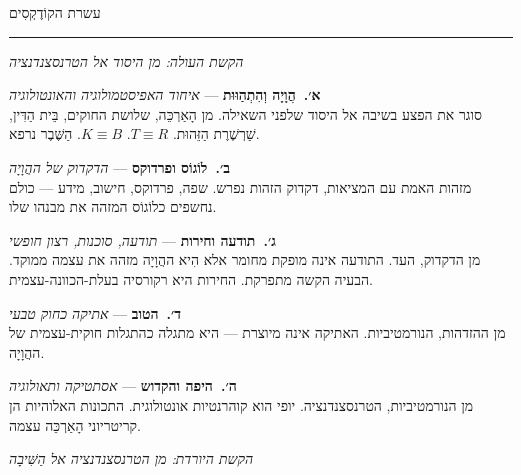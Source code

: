 \documentclass[10pt, openany, oneside]{book}
\renewcommand{\large}{\fontsize{11.5}{14}\selectfont}
\newcommand{\separator}{%
    \begin{center}
        \vspace{0.3em}
        \rule{0.3\textwidth}{0.4pt}
        \vspace{0.3em}
    \end{center}
}
\begin{document}
\begin{center}
    {\large\textsc{עשרת הקוֹדֶקְסִים}}
\end{center}
\separator

\vspace{0.3em}

\begin{center}
    \textit{הקשת העולה: מן היסוד אל הטרנסצנדנציה}
\end{center}

\vspace{0.5em}

\noindent \textbf{א׳.\ הֲוָיָה וְהִתְהַוּוּת} --- \textit{איחוד האפיסטמולוגיה והאונטולוגיה}\\
סוגר את הפצע בשיבה אל היסוד שלפני השאילה. מן הָאַרְכֵּה, שלושת החוקים, בֵּית הַדִּין, שַׁרְשֶׁרֶת הַזֵּהוּת. $T \equiv R$. $K \equiv B$. הַשֶּׁבֶר נרפא.

\vspace{0.5em}

\noindent \textbf{ב׳.\ לוֹגוֹס ופרדוקס} --- \textit{הדקדוק של ההֲוָיָה}\\
מזהות האמת עם המציאות, דקדוק הזהות נפרש. שפה, פרדוקס, חישוב, מידע — כולם נחשפים כלוֹגוֹס המזהה את מבנהו שלו.

\vspace{0.5em}

\noindent \textbf{ג׳.\ תודעה וחירות} --- \textit{תודעה, סוכנות, רצון חופשי}\\
מן הדקדוק, העד. התודעה אינה מופקת מחומר אלא הִיא ההֲוָיָה מזהה את עצמה ממוקד. הבעיה הקשה מתפרקת. החירות היא רקורסיה בעלת-הכוונה-עצמית.

\vspace{0.5em}

\noindent \textbf{ד׳.\ הטוב} --- \textit{אתיקה כחוק טבעי}\\
מן ההזדהות, הנורמטיביות. האתיקה אינה מיוצרת — היא מתגלה כהתגלות חוקית-עצמית של ההֲוָיָה.

\vspace{0.5em}

\noindent \textbf{ה׳.\ היפה והקדוש} --- \textit{אסתטיקה ותאולוגיה}\\
מן הנורמטיביות, הטרנסצנדנציה. יופי הוא קוהרנטיות אונטולוגית. התכונות האלוהיות הן קריטריוני הָאַרְכֵּה עצמה.

\vspace{1.5em}

\begin{center}
    \textit{הקשת היורדת: מן הטרנסצנדנציה אל הַשִּׁיבָה}
\end{center}
\end{document}
